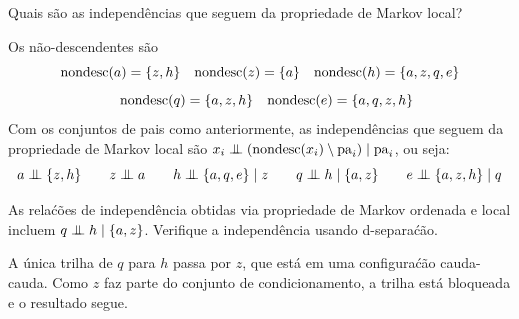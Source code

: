 \begin{exenumerate}
    \item Quais s\~ao as independ\^encias que seguem da propriedade de Markov local?
    
    \begin{solution}
        Os n\~ao-descendentes s\~ao
        $$\textrm{nondesc}(a) = \{z,h\} \quad \textrm{nondesc}(z) = \{a\} \quad \textrm{nondesc}(h) = \{a,z,q,e\}$$
        $$\quad \textrm{nondesc}(q) = \{a,z,h\} \quad \textrm{nondesc}(e) = \{a,q,z,h\}$$
        Com os conjuntos de pais como anteriormente, as independ\^encias que seguem da propriedade de Markov local s\~ao $x_i \mathrel{\perp\mspace{-10mu}\perp} \left( \textrm{nondesc}(x_i)\setminus \mathrm{pa}_i \right) \mid \mathrm{pa}_i$, ou seja:
        $$a \independent \{z,h\} \quad \quad z \independent a \quad \quad h \independent \{a,q,e\} \mid z \quad \quad q \independent  h \mid \{a,z\} \quad \quad e \independent \{a,z,h\} \mid q$$
        
        
    \end{solution}
    
    
    \item As rela\'c\~oes de independ\^encia obtidas via propriedade de Markov ordenada e local
    incluem $q \mathrel{\perp\mspace{-10mu}\perp} h \mid \{a,z\}$. Verifique
    a independ\^encia usando d-separa\'c\~ao.
    
    \begin{solution}
        
        A \'unica trilha de $q$ para $h$ passa por $z$, que est\'a em uma configura\'c\~ao cauda-cauda. Como $z$ faz parte do conjunto de condicionamento, a trilha est\'a bloqueada e o resultado segue.
    \end{solution}
    

\end{exenumerate}
